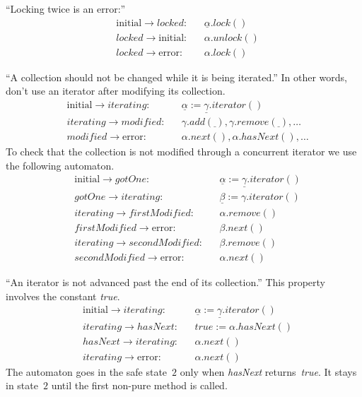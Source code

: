 \documentclass[a4paper]{article}
\newcommand{\pat}{\underline}
\theoremstyle{remark}
\begin{document}
``Locking twice is an error:''
\begin{equation}
\begin{aligned}
&\mathrm{initial}\to\mathit{locked}: &&\pat\alpha.\mathit{lock}()\\
&\mathit{locked}\to\mathrm{initial}: &&\alpha.\mathit{unlock}()\\
&\mathit{locked}\to\mathrm{error}: &&\alpha.\mathit{lock}()
\end{aligned}
\end{equation}

``A collection should not be changed while it is being iterated.''
In other words, don't use an iterator after modifying its collection.
\begin{equation}\label{eq:iter1}
\begin{aligned}
&\mathrm{initial}\to\mathit{iterating}: 
  &&\pat\alpha := \pat\gamma.\mathit{iterator}()\\
&\mathit{iterating}\to\mathit{modified}:
  &&\gamma.\mathit{add}(\pat\ ), 
    \gamma.\mathit{remove}(\pat\ ), \ldots \\
&\mathit{modified}\to\mathrm{error}: 
  &&\alpha.\mathit{next}(), \alpha.\mathit{hasNext}(), \ldots
\end{aligned}
\end{equation}
To check that the collection is not modified through a concurrent iterator we use the following automaton.
\begin{equation}\label{eq:iter2}
\begin{aligned}
&\mathrm{initial}\to\mathit{gotOne}: 
  && \pat\alpha := \pat\gamma.\mathit{iterator}() \\
&\mathit{gotOne}\to\mathit{iterating}: 
  && \pat\beta := \gamma.\mathit{iterator}() \\
&\mathit{iterating}\to\mathit{firstModified}: 
  &&\alpha.\mathit{remove}()\\
&\mathit{firstModified}\to\mathrm{error}: 
  &&\beta.\mathit{next}()\\
&\mathit{iterating}\to\mathit{secondModified}: 
  &&\beta.\mathit{remove}()\\
&\mathit{secondModified}\to\mathrm{error}: 
  &&\alpha.\mathit{next}()
\end{aligned}
\end{equation}

``An iterator is not advanced past the end of its collection.''
This property involves the constant \textit{true}.
\begin{equation}\label{eq:iter3}
\begin{aligned}
&\mathrm{initial}\to\mathit{iterating}: 
  && \pat\alpha := \pat\gamma.\mathit{iterator}() \\
&\mathit{iterating}\to\mathit{hasNext}: 
  &&\mathit{true} := \alpha.\mathit{hasNext}() \\
&\mathit{hasNext}\to\mathit{iterating}: 
  &&\alpha.\mathit{next}() \\
&\mathit{iterating}\to\mathrm{error}: 
  &&\alpha.\mathit{next}() 
\end{aligned}
\end{equation}
The automaton goes in the safe state~$2$ only when \textit{hasNext} returns~\textit{true}.
It stays in state~$2$ until the first non-pure method is called.
\end{document}
